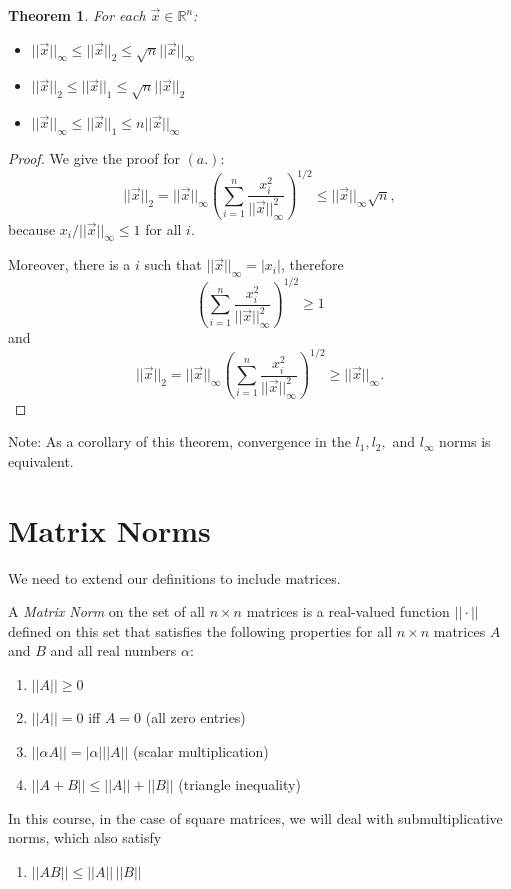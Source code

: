 \documentclass[12pt]{article}
\newcommand{\vecx}{\ensuremath{\vec{x}}}
\newtheorem{theorem}{Theorem}
\newenvironment{definition}[1][Definition]{\begin{trivlist}
\item[\hskip \labelsep {\bfseries #1}]}{\end{trivlist}}
\begin{document}
\begin{theorem}
For each $\vecx \in \mathbb{R}^n$:
\begin{itemize}
\item[a.] $||\vecx||_\infty \leq ||\vecx||_2 \leq \sqrt{n}||\vecx||_\infty$
\item[b.] $||\vecx||_2 \leq ||\vecx||_1 \leq \sqrt{n}||\vecx||_2$
\item[c.] $||\vecx||_\infty \leq ||\vecx||_1 \leq n||\vecx||_\infty$
\end{itemize} 
\end{theorem}

\begin{proof}
We give the proof for $(a.)$:  
\[
||\vecx||_2 = ||\vecx||_\infty \left(\sum_{i=1}^n\frac{x_i^2}{||\vecx||_\infty^2}\right)^{1/2} \leq ||\vecx||_\infty\sqrt{n},
\]
because $x_i/||\vecx||_\infty \leq 1$ for all $i$.

Moreover, there is a $i$ such that $||\vecx||_\infty=|x_i|$, therefore
\[
\left(\sum_{i=1}^n\frac{x_i^2}{||\vecx||_\infty^2}\right)^{1/2}\geq 1
\]
and
\[
||\vecx||_2 = ||\vecx||_\infty \left(\sum_{i=1}^n\frac{x_i^2}{||\vecx||_\infty^2}\right)^{1/2} \geq ||\vecx||_\infty.
\]
\end{proof}

Note: As a corollary of this theorem, convergence in the $l_1, l_2,$ and $l_\infty$ norms is equivalent.


\section{Matrix Norms}

We need to extend our definitions to include matrices.
\begin{definition}
A \textit{Matrix Norm} on the set of all $n \times n$ matrices is a real-valued function $||\cdot||$ defined on this set that satisfies the following properties for all $n \times n$ matrices $A$ and $B$ and all real numbers $\alpha$:
\begin{enumerate}
\item $|| A|| \geq 0$ 
\item $|| A|| = 0$ iff $A = 0$ (all zero entries)
\item $|| \alpha A|| = |\alpha| ||A||$ (scalar multiplication)
\item $|| A + B|| \leq ||A|| + ||B||$ (triangle inequality)
\end{enumerate}
In this course, in the case of square matrices, we will deal with submultiplicative norms, which also satisfy
\begin{enumerate}
\item[5.] $|| AB|| \leq ||A||\, ||B||$
\end{enumerate}
\end{definition}
\end{document}
